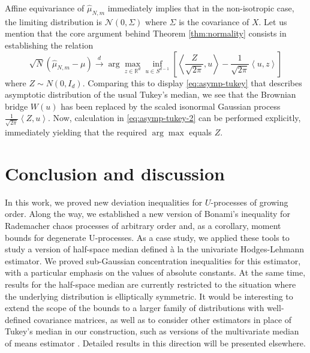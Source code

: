 \documentclass[12pt]{article}
\newcommand{\wh}{\widehat}
\def\l{\left}
\def\r{\right}
\newcommand{\mb}{\mathbb}
\newcommand{\dotp}[2]{\left\langle#1,#2\right\rangle}
\theoremstyle{thmstyletwo}%
\theoremstyle{thmstylethree}%
\begin{document}
Affine equivariance of $\wh\mu_{N,m}$ immediately implies that in the non-isotropic case, the limiting distribution is $\mathcal{N}(0, \Sigma)$ where $\Sigma$ is the covariance of $X$. 
Let us mention that the core argument behind Theorem \ref{thm:normality} consists in establishing the relation
\begin{equation}
    \label{eq:asymp-tukey-2}
 \sqrt{N}\l( \wh\mu_{N,m} - \mu \r) \xrightarrow[]{d}  \arg\max_{z\in \mb R^d} \inf_{u\in S^{d-1}} \l[\dotp{\frac{Z}{\sqrt{2\pi}}}{u} - \frac{1}{\sqrt{2\pi}}\dotp{u}{z} \r]
\end{equation}
where $Z\sim N(0,I_d)$. Comparing this to display \eqref{eq:asymp-tukey} that describes asymptotic distribution of the usual Tukey's median, we see that the Brownian bridge $W(u)$ has been replaced by the scaled isonormal Gaussian process $\frac{1}{\sqrt{2\pi}}\dotp{Z}{u}$. Now, calculation in \eqref{eq:asymp-tukey-2} can be performed explicitly, immediately yielding that the required $\arg\max$ equals $Z$. 


\section{Conclusion and discussion}

In this work, we proved new deviation inequalities for $U$-processes of growing order. Along the way, we established a new version of Bonami's inequality for Rademacher chaos processes of arbitrary order and, as a corollary, moment bounds for degenerate U-processes.   
As a case study, we applied these tools to study a version of half-space median defined \`{a} la the univariate Hodges-Lehmann estimator. We proved  sub-Gaussian concentration inequalities for this estimator, with a particular emphasis on the values of absolute constants. 
At the same time, results for the half-space median are currently restricted to the situation where the underlying distribution is elliptically symmetric. It would be interesting to extend the scope of the bounds to a larger family of distributions with well-defined covariance matrices, as well as to consider other estimators in place of Tukey's median in our construction, such as versions of the multivariate median of means estimator \citep{lugosi2019mean}. Detailed results in this direction will be presented elsewhere.
\end{document}
